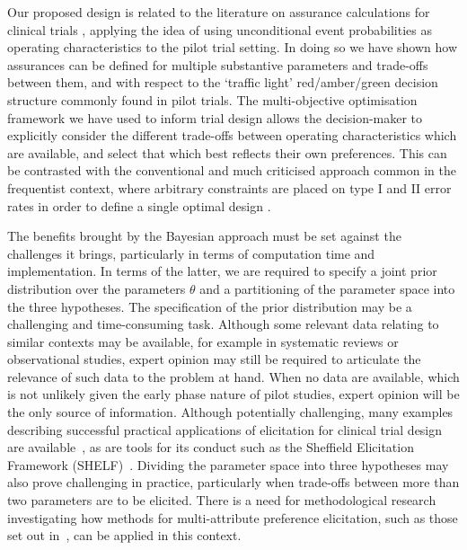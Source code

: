 \documentclass[AMA,STIX1COL]{WileyNJD-v2}
\begin{document}
Our proposed design is related to the literature on assurance calculations for clinical trials \cite{OHagan2005}, applying the idea of using unconditional event probabilities as operating characteristics to the pilot trial setting. In doing so we have shown how assurances can be defined for multiple substantive parameters and trade-offs between them, and with respect to the `traffic light' red/amber/green decision structure commonly found in pilot trials. The multi-objective optimisation framework we have used to inform trial design allows the decision-maker to explicitly consider the different trade-offs between operating characteristics which are available, and select that which best reflects their own preferences. This can be contrasted with the conventional and much criticised approach common in the frequentist context, where arbitrary constraints are placed on type I and II error rates in order to define a single optimal design \cite{Bacchetti2010}.

The benefits brought by the Bayesian approach must be set against the challenges it brings, particularly in terms of computation time and implementation. In terms of the latter, we are required to specify a joint prior distribution over the parameters $\theta$ and a partitioning of the parameter space into the three hypotheses. The specification of the prior distribution may be a challenging and time-consuming task. Although some relevant data relating to similar contexts may be available, for example in systematic reviews or observational studies, expert opinion may still be required to articulate the relevance of such data to the problem at hand. When no data are available, which is not unlikely given the early phase nature of pilot studies, expert opinion will be the only source of information. Although potentially challenging, many examples describing successful practical applications of elicitation for clinical trial design are available~\cite{Walley2015, Crisp2018, Dallow2018}, as are tools for its conduct such as the Sheffield Elicitation Framework (SHELF)~\cite{OHagan2006a}. Dividing the parameter space into three hypotheses may also prove challenging in practice, particularly when trade-offs between more than two parameters are to be elicited. There is a need for methodological research investigating how methods for multi-attribute preference elicitation, such as those set out in~\cite{Keeney1976}, can be applied in this context. 
\end{document}
